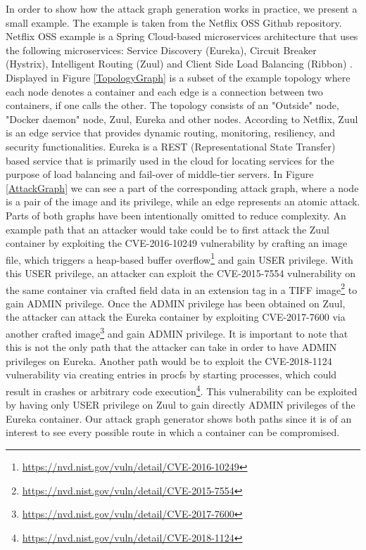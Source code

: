 In order to show how the attack graph generation works in practice, we present a small example. The example is taken from the Netflix OSS Github repository. Netflix OSS example is a Spring Cloud-based microservices architecture that uses the following microservices: Service Discovery (Eureka), Circuit Breaker (Hystrix), Intelligent Routing (Zuul) and Client Side Load Balancing (Ribbon) \cite{netflixoss, springcloudnetflix}. Displayed in Figure \ref{TopologyGraph} is a subset of the example topology where each node denotes a container and each edge is a connection between two containers, if one calls the other. The topology consists of an "Outside" node, "Docker daemon" node, Zuul, Eureka and other nodes. According to Netflix, Zuul is an edge service that provides dynamic routing, monitoring, resiliency, and security functionalities. Eureka is a REST (Representational State Transfer) based service that is primarily used in the cloud for locating services for the purpose of load balancing and fail-over of middle-tier servers. In Figure \ref{AttackGraph} we can see a part of the corresponding attack graph, where a node is a pair of the image and its privilege, while an edge represents an atomic attack. Parts of both graphs have been intentionally omitted to reduce complexity. An example path that an attacker would take could be to first attack the Zuul container by exploiting the CVE-2016-10249 vulnerability by crafting an image file, which triggers a heap-based buffer overflow\footnote{\url{https://nvd.nist.gov/vuln/detail/CVE-2016-10249}} and gain USER privilege.  With this USER privilege, an attacker can exploit the CVE-2015-7554 vulnerability on the same container via crafted field data in an extension tag in a TIFF image\footnote{\url{https://nvd.nist.gov/vuln/detail/CVE-2015-7554}} to gain ADMIN privilege. Once the ADMIN privilege has been obtained on Zuul, the attacker can attack the Eureka container by exploiting CVE-2017-7600 via another crafted image\footnote{\url{https://nvd.nist.gov/vuln/detail/CVE-2017-7600}} and gain ADMIN privilege. It is important to note that this is not the only path that the attacker can take in order to have ADMIN privileges on Eureka. Another path would be to exploit the CVE-2018-1124 vulnerability via creating entries in procfs by starting processes, which could result in crashes or arbitrary code execution\footnote{\url{https://nvd.nist.gov/vuln/detail/CVE-2018-1124}}. This vulnerability can be exploited by having only USER privilege on Zuul to gain directly ADMIN privileges of the Eureka container. Our attack graph generator shows both paths since it is of an interest to see every possible route in which a container can be compromised.



